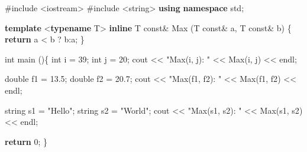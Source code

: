 \documentclass[
]{article}
\newenvironment{Shaded}{}{}
\newcommand{\AttributeTok}[1]{\textcolor[rgb]{0.49,0.56,0.16}{#1}}
\newcommand{\ControlFlowTok}[1]{\textcolor[rgb]{0.00,0.44,0.13}{\textbf{#1}}}
\newcommand{\DataTypeTok}[1]{\textcolor[rgb]{0.56,0.13,0.00}{#1}}
\newcommand{\DecValTok}[1]{\textcolor[rgb]{0.25,0.63,0.44}{#1}}
\newcommand{\FloatTok}[1]{\textcolor[rgb]{0.25,0.63,0.44}{#1}}
\newcommand{\ImportTok}[1]{#1}
\newcommand{\KeywordTok}[1]{\textcolor[rgb]{0.00,0.44,0.13}{\textbf{#1}}}
\newcommand{\NormalTok}[1]{#1}
\newcommand{\OperatorTok}[1]{\textcolor[rgb]{0.40,0.40,0.40}{#1}}
\newcommand{\PreprocessorTok}[1]{\textcolor[rgb]{0.74,0.48,0.00}{#1}}
\newcommand{\StringTok}[1]{\textcolor[rgb]{0.25,0.44,0.63}{#1}}
\begin{document}
\begin{Shaded}
\begin{Highlighting}[]
\PreprocessorTok{\#include }\ImportTok{\textless{}iostream\textgreater{}}
\PreprocessorTok{\#include }\ImportTok{\textless{}string\textgreater{}}
\KeywordTok{using} \KeywordTok{namespace}\NormalTok{ std}\OperatorTok{;}

\KeywordTok{template} \OperatorTok{\textless{}}\KeywordTok{typename}\NormalTok{ T}\OperatorTok{\textgreater{}}
\KeywordTok{inline}\NormalTok{ T }\AttributeTok{const}\OperatorTok{\&}\NormalTok{ Max }\OperatorTok{(}\NormalTok{T }\AttributeTok{const}\OperatorTok{\&}\NormalTok{ a}\OperatorTok{,}\NormalTok{ T }\AttributeTok{const}\OperatorTok{\&}\NormalTok{ b}\OperatorTok{)} \OperatorTok{\{} 
    \ControlFlowTok{return}\NormalTok{ a }\OperatorTok{\textless{}}\NormalTok{ b }\OperatorTok{?}\NormalTok{ b}\OperatorTok{:}\NormalTok{a}\OperatorTok{;} 
\OperatorTok{\}} 

\DataTypeTok{int}\NormalTok{ main }\OperatorTok{()\{} 
    \DataTypeTok{int}\NormalTok{ i }\OperatorTok{=} \DecValTok{39}\OperatorTok{;}
    \DataTypeTok{int}\NormalTok{ j }\OperatorTok{=} \DecValTok{20}\OperatorTok{;}
\NormalTok{    cout }\OperatorTok{\textless{}\textless{}} \StringTok{"Max(i, j): "} \OperatorTok{\textless{}\textless{}}\NormalTok{ Max}\OperatorTok{(}\NormalTok{i}\OperatorTok{,}\NormalTok{ j}\OperatorTok{)} \OperatorTok{\textless{}\textless{}}\NormalTok{ endl}\OperatorTok{;} 

    \DataTypeTok{double}\NormalTok{ f1 }\OperatorTok{=} \FloatTok{13.5}\OperatorTok{;} 
    \DataTypeTok{double}\NormalTok{ f2 }\OperatorTok{=} \FloatTok{20.7}\OperatorTok{;} 
\NormalTok{    cout }\OperatorTok{\textless{}\textless{}} \StringTok{"Max(f1, f2): "} \OperatorTok{\textless{}\textless{}}\NormalTok{ Max}\OperatorTok{(}\NormalTok{f1}\OperatorTok{,}\NormalTok{ f2}\OperatorTok{)} \OperatorTok{\textless{}\textless{}}\NormalTok{ endl}\OperatorTok{;} 

\NormalTok{    string s1 }\OperatorTok{=} \StringTok{"Hello"}\OperatorTok{;} 
\NormalTok{    string s2 }\OperatorTok{=} \StringTok{"World"}\OperatorTok{;} 
\NormalTok{    cout }\OperatorTok{\textless{}\textless{}} \StringTok{"Max(s1, s2): "} \OperatorTok{\textless{}\textless{}}\NormalTok{ Max}\OperatorTok{(}\NormalTok{s1}\OperatorTok{,}\NormalTok{ s2}\OperatorTok{)} \OperatorTok{\textless{}\textless{}}\NormalTok{ endl}\OperatorTok{;} 

   \ControlFlowTok{return} \DecValTok{0}\OperatorTok{;}
\OperatorTok{\}}
\end{Highlighting}
\end{Shaded}
\end{document}
